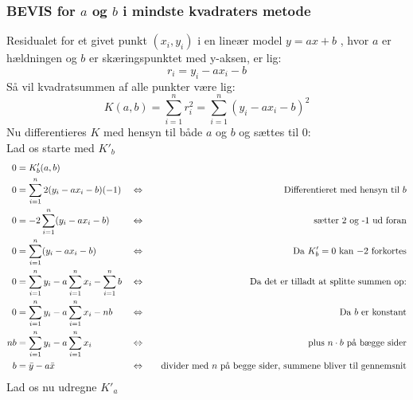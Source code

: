 \documentclass{article}
\begin{document}
\subsubsection{BEVIS for $a$ og $b$ i mindste kvadraters metode}
Residualet for et givet punkt \((x_i, y_i)\) i en lineær model \( y = ax + b \) , hvor \( a \) er hældningen og \( b \) er skæringspunktet med y-aksen, er lig:
$$
r_i=y_i-ax_i-b
$$
Så vil kvadratsummen af alle punkter være lig:
$$
K(a, b) = \sum_{i=1}^{n} r_i^2=\sum_{i=1}^{n} (y_i-ax_i-b)^2
$$
Nu differentieres $K$ med hensyn til både $a$ og $b$ og sættes til 0:\\
Lad os starte med $K'_b$ 
\begin{align*}
0&=K'_b(a,b)\\
0&=\sum_{i=1}^{n} 2(y_i-ax_i-b)(-1)                     &&\Leftrightarrow &&&\text{Differentieret med hensyn til $b$} \\
0&=-2\sum_{i=1}^{n} (y_i-ax_i-b)                        &&\Leftrightarrow &&&\text{sætter 2 og -1 ud foran} \\
0&=\sum_{i=1}^{n} (y_i-ax_i-b)                          &&\Leftrightarrow &&&\text{Da $K'_b=0$ kan $-2$ forkortes}\\
0&=\sum_{i=1}^{n}y_i-a\sum_{i=1}^{n}x_i-\sum_{i=1}^{n}b &&\Leftrightarrow &&&\text{Da det er tilladt at splitte summen op:}\\
0&=\sum_{i=1}^{n}y_i-a\sum_{i=1}^{n}x_i-nb              &&\Leftrightarrow &&&\text{Da $b$ er konstant}\\
nb&=\sum_{i=1}^{n}y_i-a\sum_{i=1}^{n}x_i                &&\Leftrightarrow &&&\text{plus $n\cdot b$ på bægge sider}\\
b&=\Bar{y}-a\Bar{x}                                     &&\Leftrightarrow &&&\text{divider med $n$ på begge sider, summene bliver til gennemsnit}\\
\end{align*}
Lad os nu udregne $K'_a$
\end{document}
